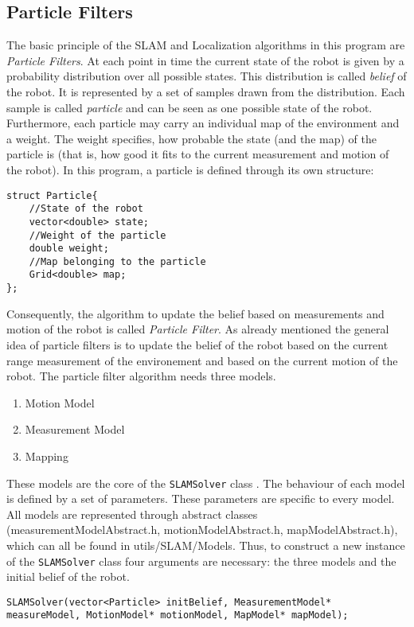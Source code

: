 \documentclass{article}
\newcommand{\SLAM}{\texttt{SLAMSolver} class }
\begin{document}
\subsection{Particle Filters}
The basic principle of the SLAM and Localization algorithms in this program are \textit{Particle Filters}. At each point in time the current state of the robot is given by a probability distribution over all possible states. This distribution is called \textit{belief} of the robot. It is represented by a set of samples drawn from the distribution. Each sample is called \textit{particle} and can be seen as one possible state of the robot. Furthermore, each particle may carry an individual map of the environment and a weight. The weight specifies, how probable the state (and the map) of the particle is (that is, how good it fits to the current measurement and motion of the robot). In this program, a particle is defined through its own structure:
\begin{lstlisting}
struct Particle{   
    //State of the robot
    vector<double> state; 
    //Weight of the particle
    double weight; 
    //Map belonging to the particle
    Grid<double> map; 
};
\end{lstlisting}
Consequently, the algorithm to update the belief based on measurements and motion of the robot is called \textit{Particle Filter}. As already mentioned the general idea of particle filters is to update the belief of the robot based on the current range measurement of the environement and based on the current motion of the robot.\newpage 
The particle filter algorithm needs three models.
\begin{enumerate}
  \item Motion Model
  \item Measurement Model
  \item Mapping
\end{enumerate} 
These models are the core of the \SLAM. The behaviour of each model is defined by a set of parameters. These parameters are specific to every model. All models are represented through abstract classes (measurementModelAbstract.h, motionModelAbstract.h, mapModelAbstract.h), which can all be found in utils/SLAM/Models. Thus, to construct a new instance of the \SLAM four arguments are necessary: the three models and the initial belief of the robot. 
\begin{lstlisting}
SLAMSolver(vector<Particle> initBelief, MeasurementModel* measureModel, MotionModel* motionModel, MapModel* mapModel);
\end{lstlisting}
\end{document}
